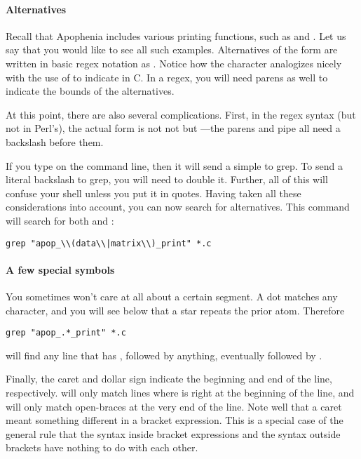 \paragraph{Alternatives} 
Recall that Apophenia includes various printing functions, such as
 and . Let us say that you
would like to see all such examples. Alternatives of the form  are written in basic regex notation as . Notice how the
\ci{|} character analogizes nicely with the use of \ci{||} 
to indicate  in C. In a regex, you will need parens as well to indicate
the bounds of the alternatives.

At this point, there are also several complications. First, in the
 regex syntax (but not in Perl's), the actual form is not
not  but ---the
parens and pipe all need a backslash before them.

If you type \ci{$\backslash$|} on the command line, then it will send a
simple \ci{|} to grep. To send a literal backslash to grep, you will
need to double it. Further, all of this will confuse your shell unless
you put it in quotes. Having taken all these considerations into
account, you can now search for alternatives. This command will search
for both  and :
\begin{lstlisting}
grep "apop_\\(data\\|matrix\\)_print" *.c
\end{lstlisting}

\paragraph{A few special symbols}
You sometimes won't care at all about a certain segment. A 
dot matches any character, and you will see below that a star 
repeats the prior atom. Therefore
\begin{lstlisting}
grep "apop_.*_print" *.c
\end{lstlisting}
will find any line that has , followed by anything,
eventually followed by .

Finally, the caret and dollar sign indicate the beginning and end of the
line, respectively.   will only match
lines where  is right at the beginning of the line, and 
 will only match open-braces at the very end of the
line. Note well that a caret meant something different in a bracket
expression. This is a special case of the general rule that the syntax
inside bracket expressions and the syntax outside brackets have nothing
to do with each other.

